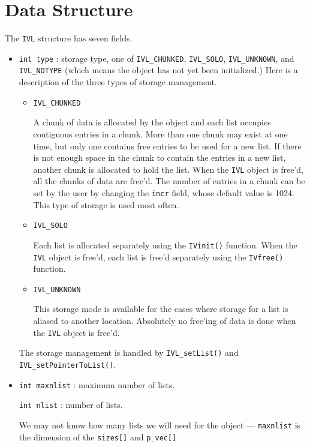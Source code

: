 \par
\section{Data Structure}
\label{section:IVL:dataStructure}
\par
The {\tt IVL} structure has seven fields.
\begin{itemize}
\item
{\tt int type} : 
           storage type, one of {\tt IVL\_CHUNKED}, {\tt IVL\_SOLO},
           {\tt IVL\_UNKNOWN}, 
             and {\tt IVL\_NOTYPE} (which means 
           the object has not yet been initialized.) 
   Here is a description of the three types of storage management.
   \begin{itemize}
   \item {\tt IVL\_CHUNKED} 
   \par
   A chunk of data is allocated by the object and each list occupies
   contiguous entries in a chunk.
   More than one chunk may exist at one time, but only one contains
   free entries to be used for a new list.
   If there is not enough space in the chunk to contain the entries
   in a new list, another chunk is allocated to hold the list.
   When the {\tt IVL} object is free'd, all the chunks of data are
   free'd.
   The number of entries in a chunk can be set by the user by changing 
   the {\tt incr} field, whose default value is 1024.
   This type of storage is used most often.
   \item {\tt IVL\_SOLO}
   \par
   Each list is allocated separately using the {\tt IVinit()} function.
   When the {\tt IVL} object is free'd, each list is free'd separately
   using the {\tt IVfree()} function.
   \item {\tt IVL\_UNKNOWN}
   \par
   This storage mode is available for the cases where storage for a
   list is aliased to another location.
   Absolutely no free'ing of data is done when the {\tt IVL} object is
   free'd.
   \end{itemize}
   The storage management is handled by {\tt IVL\_setList()}
   and {\tt IVL\_setPointerToList()}.
\item
{\tt int maxnlist} : maximum number of lists.
\par
{\tt int nlist} : number of lists.
\par
We may not know how many lists we will need for the object --- 
{\tt maxnlist} is the dimension of the {\tt sizes[]} and {\tt p\_vec[]}

\end{itemize}
